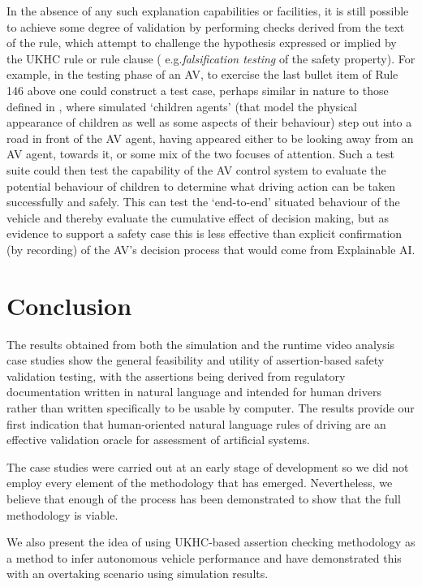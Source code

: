 In the absence of any such explanation capabilities or facilities, it is still possible to achieve some degree of validation by performing checks 
derived from the text of the rule, which attempt to challenge the hypothesis expressed or implied by the UKHC rule or rule clause (
e.g.\emph{falsification testing} of the safety property). 
%
For example, in the testing phase of an AV, to exercise the last bullet item of Rule 146 above one could construct a test case, perhaps similar in nature to those defined in \cite{EuroNCAP}, where simulated `children agents' (that model the physical appearance of children as well as some aspects of their behaviour) step out into a road in front of the AV agent, having appeared either to be looking away from an AV agent, towards it, or some mix of the two focuses of attention. 
%
Such a test suite could then test the capability of the AV control system to evaluate the potential behaviour of children to determine what driving action can be taken successfully and safely. 
%
This can test the `end-to-end' situated behaviour of the vehicle and thereby evaluate the cumulative effect of decision making, but as evidence to support a safety case this is less effective than explicit confirmation (by recording) of the AV's decision process that would come from Explainable AI.

\section{Conclusion}\label{conclusion}
The results obtained from both the simulation and the runtime video analysis case studies show the general feasibility and utility of assertion-based safety validation testing, with the assertions being derived from regulatory documentation written in natural language and intended for human drivers rather than written specifically to be usable by computer. The results provide our first indication that human-oriented natural language rules of driving are an effective validation oracle for assessment of artificial systems.

The case studies were carried out at an early stage of development so we did not employ every element of the methodology that has emerged. Nevertheless, we believe that enough of the process has been demonstrated to show that the full methodology is viable.

We also present the idea of using UKHC-based assertion checking methodology as a method to infer autonomous vehicle performance and have demonstrated this with an overtaking scenario using simulation results.

